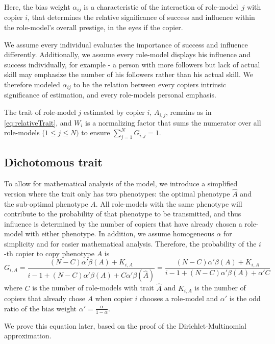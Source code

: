 \documentclass[12pt]{extarticle}
\begin{document}
Here, the bias weight $\alpha_{ij}$ is a characteristic of the interaction of role-model~$j$ with copier $i$, that determines the relative significance of success and influence within the role-model's overall prestige, in the eyes if the copier.

We assume every individual evaluates the importance of success and influence differently. Additionally, we assume every role-model displays his influence and success individually, for example - a person with more followers but lack of actual skill may emphasize the number of his followers rather than his actual skill. We therefore modeled $\alpha_{ij}$ to be the relation between every copiers intrinsic significance of estimation, and every role-models personal emphasis.
 

The trait of role-model $j$ estimated by copier $i$, $A_{i,j}$, remains as in \cref{eq:relativeTrait}, and $W_i$ is a normalizing factor that sums the numerator over all role-models ($1\le j \le N)$ to ensure $\sum_{j=1}^{N}{G_{i,j}}=1$.



\subsection{Dichotomous trait}
To allow for mathematical analysis of the model, we introduce a simplified version where the trait only has two phenotypes: the optimal phenotype $\hat{A}$ and the sub-optimal phenotype $A$. 
All role-models with the same phenotype will contribute to the probability of that phenotype to be transmitted, and thus influence is determined by the number of copiers that have already chosen a role-model with either phenotype.
In addition, we assume homogeneous $\alpha$ for simplicity and for easier mathematical analysis.
Therefore, the probability of the $i$-th copier to copy phenotype $A$ is
\begin{equation}\label{eq:binary-model}
G_{i,A} = \frac{(N-C)\alpha'\beta(A) + K_{i,A}}{i-1 + (N-C)\alpha'\beta(A) + C\alpha'\beta(\hat{A})} = \frac{(N-C)\alpha'\beta(A) + K_{i,A}}{i-1 + (N-C)\alpha'\beta(A) + \alpha'C}
\end{equation}
where $C$ is the number of role-models with trait $\hat{A}$ and $K_{i,A}$ is the number of copiers that already chose $A$ when copier $i$ chooses a role-model and $\alpha'$ is the odd ratio of the bias weight $\alpha'= \frac{\alpha}{1-\alpha}$.

We prove this equation later, based on the proof of the Dirichlet-Multinomial approximation.
\end{document}
